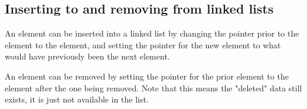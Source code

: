 
\subsection{Inserting to and removing from linked lists}

An element can be inserted into a linked list by changing the pointer prior to the element to the element, and setting the pointer for the new element to what would have previously been the next element.

An element can be removed by setting the pointer for the prior element to the element after the one being removed. Note that this means the "deleted" data still exists, it is just not available in the list.

